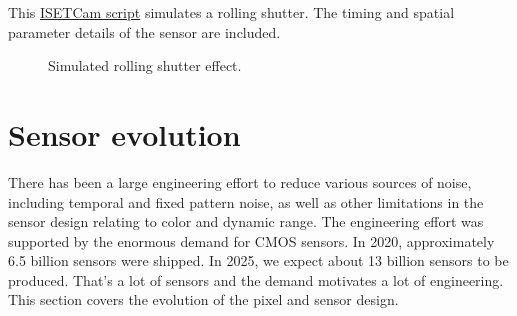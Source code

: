 \documentclass[
  letterpaper,
]{book}
\begin{document}
\begin{tcolorbox}[enhanced jigsaw, colframe=quarto-callout-note-color-frame, titlerule=0mm, rightrule=.15mm, opacitybacktitle=0.6, colback=white, leftrule=.75mm, coltitle=black, title=\textcolor{quarto-callout-note-color}{\faInfo}\hspace{0.5em}{Rolling shutter simulation}, bottomrule=.15mm, colbacktitle=quarto-callout-note-color!10!white, breakable, left=2mm, bottomtitle=1mm, toptitle=1mm, opacityback=0, arc=.35mm, toprule=.15mm]

This \href{../code/03Sensor/fise_sensorRollingShutter.html}{ISETCam
script} simulates a rolling shutter. The timing and spatial parameter
details of the sensor are included.

\begin{figure}[H]


\caption{\label{fig-rolling-shutter-simulated}Simulated rolling shutter
effect.}

\end{figure}%

\end{tcolorbox}

\section{Sensor evolution}\label{sec-sensor-evolution}

There has been a large engineering effort to reduce various sources of
noise, including temporal and fixed pattern noise, as well as other
limitations in the sensor design relating to color and dynamic range.
The engineering effort was supported by the enormous demand for CMOS
sensors. In 2020, approximately 6.5 billion sensors were shipped. In
2025, we expect about 13 billion sensors to be produced. That's a lot of
sensors and the demand motivates a lot of engineering. This section
covers the evolution of the pixel and sensor design.
\end{document}
